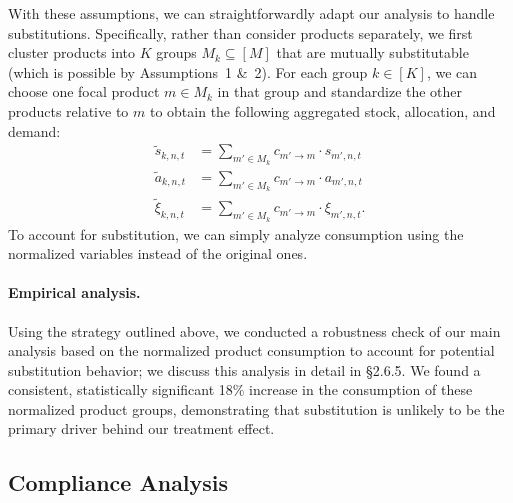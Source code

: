 \documentclass[12pt]{article}
\begin{document}
With these assumptions, we can straightforwardly adapt our analysis to handle substitutions. Specifically, rather than consider products separately, we first cluster products into $K$ groups $M_k\subseteq[M]$ that are mutually substitutable (which is possible by Assumptions~1 \&~2). For each group $k\in[K]$, we can choose one focal product $m\in M_k$ in that group and standardize the other products relative to $m$ to obtain the following aggregated stock, allocation, and demand:
\begin{align*}
\tilde{s}_{k,n,t}&=\sum_{m'\in M_k}c_{m'\to m}\cdot s_{m',n,t} \\
\tilde{a}_{k,n,t}&=\sum_{m'\in M_k}c_{m'\to m}\cdot a_{m',n,t} \\
\tilde\xi_{k,n,t}&=\sum_{m'\in M_k}c_{m'\to m}\cdot\xi_{m',n,t}.
\end{align*}
To account for substitution, we can simply analyze consumption using the normalized variables instead of the original ones.

\paragraph{Empirical analysis.}

Using the strategy outlined above, we conducted a robustness check of our main analysis based on the normalized product consumption to account for potential substitution behavior; we discuss this analysis in detail in \S2.6.5. We found a consistent, statistically significant 18\% increase in the consumption of these normalized product groups, demonstrating that substitution is unlikely to be the primary driver behind our treatment effect.

\subsection{Compliance Analysis}
\label{sup:compliance}
\end{document}
